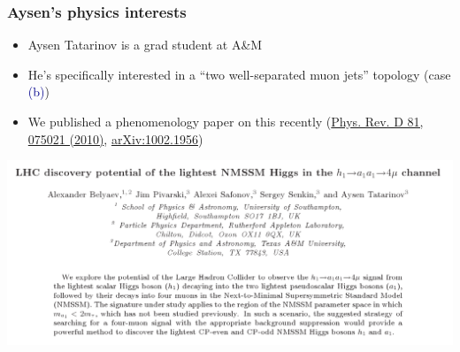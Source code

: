 \documentclass[compress]{beamer}
\begin{document}
\begin{frame}
\frametitle{Aysen's physics interests}

\begin{itemize}
\item Aysen Tatarinov is a grad student at A\&M
\item He's specifically interested in a ``two well-separated muon jets'' topology (case \textcolor{darkblue}{(b)})
\item We published a phenomenology paper on this recently {\scriptsize (\href{http://prd.aps.org/abstract/PRD/v81/i7/e075021}{Phys. Rev. D 81, 075021 (2010)}, \href{http://arxiv.org/abs/1002.1956}{arXiv:1002.1956})}
\end{itemize}

\includegraphics[width=\linewidth]{higgspaper.png}

\end{frame}
\end{document}
